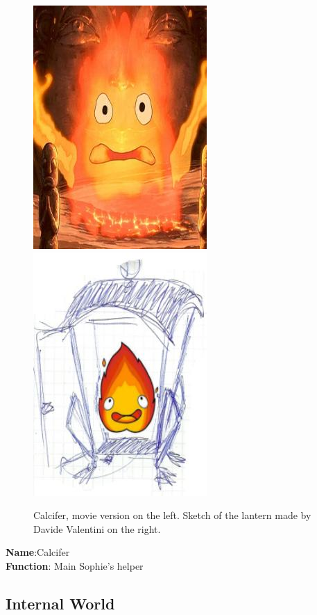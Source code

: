  \begin{figure}[H]
  {\includegraphics{Images/Characters/calcifer}}		
  \qquad%
      {\includegraphics{Images/Characters/lantern}}
      \caption{Calcifer, movie version on the left. Sketch of the lantern made by Davide Valentini on the right.}
\end{figure}

\textbf{Name}:Calcifer \\
\textbf{Function}: Main Sophie's helper

\subsection{Internal World}

